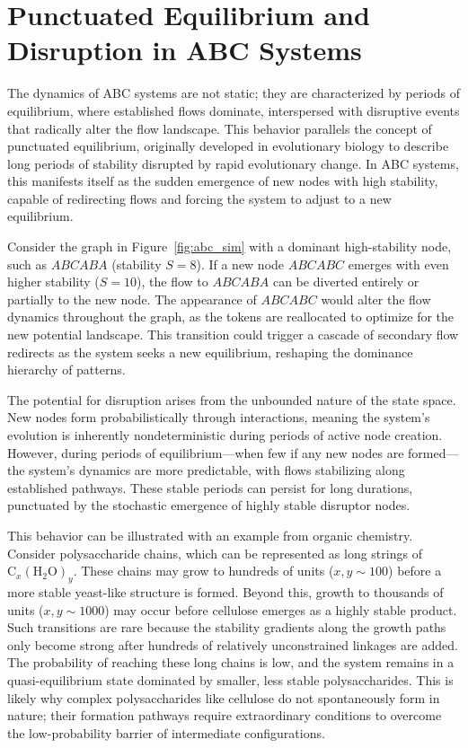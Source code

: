 \documentclass[entropy,article,submit,pdftex,oneauthor]{Definitions/mdpi}
\begin{document}
\section{Punctuated Equilibrium and Disruption in ABC Systems}

The dynamics of ABC systems are not static; they are characterized by periods of equilibrium, where established flows dominate, interspersed with disruptive events that radically alter the flow landscape. This behavior parallels the concept of punctuated equilibrium, originally developed in evolutionary biology to describe long periods of stability disrupted by rapid evolutionary change. In ABC systems, this manifests itself as the sudden emergence of new nodes with high stability, capable of redirecting flows and forcing the system to adjust to a new equilibrium.

Consider the graph in Figure~\ref{fig:abc_sim} with a dominant high-stability node, such as \( ABCABA \) (stability \( S = 8 \)). If a new node \( ABCABC \) emerges with even higher stability (\( S = 10 \)), the flow to \( ABCABA \) can be diverted entirely or partially to the new node. The appearance of \( ABCABC \) would alter the flow dynamics throughout the graph, as the tokens are reallocated to optimize for the new potential landscape. This transition could trigger a cascade of secondary flow redirects as the system seeks a new equilibrium, reshaping the dominance hierarchy of patterns.

The potential for disruption arises from the unbounded nature of the state space. New nodes form probabilistically through interactions, meaning the system's evolution is inherently nondeterministic during periods of active node creation. However, during periods of equilibrium—when few if any new nodes are formed—the system's dynamics are more predictable, with flows stabilizing along established pathways. These stable periods can persist for long durations, punctuated by the stochastic emergence of highly stable disruptor nodes.

This behavior can be illustrated with an example from organic chemistry. Consider polysaccharide chains, which can be represented as long strings of \( \text{C}_x(\text{H}_2\text{O})_y \). These chains may grow to hundreds of units (\( x, y \sim 100 \)) before a more stable yeast-like structure is formed. Beyond this, growth to thousands of units (\( x, y \sim 1000 \)) may occur before cellulose emerges as a highly stable product. Such transitions are rare because the stability gradients along the growth paths only become strong after hundreds of relatively unconstrained linkages are added. The probability of reaching these long chains is low, and the system remains in a quasi-equilibrium state dominated by smaller, less stable polysaccharides. This is likely why complex polysaccharides like cellulose do not spontaneously form in nature; their formation pathways require extraordinary conditions to overcome the low-probability barrier of intermediate configurations.
\end{document}
